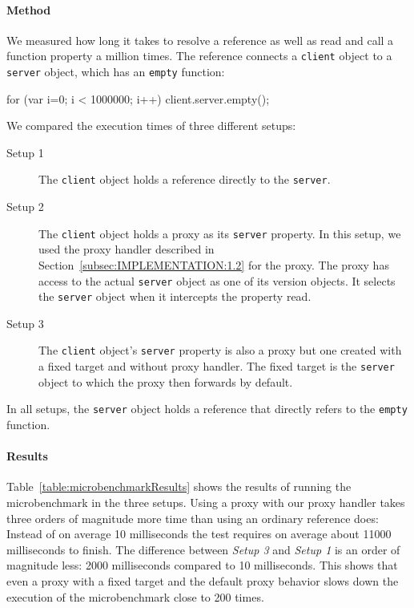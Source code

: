 \documentclass{sigplanconf}
\begin{document}
\paragraph{Method}
We measured how long it takes to resolve a reference as well as read
and call a function property a million times.  The reference connects
a \lstinline{client} object to a \lstinline{server} object, which has
an \lstinline{empty} function:

\begin{code}
for (var i=0; i < 1000000; i++) {
    client.server.empty();
} 
\end{code}

We compared the execution times of three different setups:

\begin{description}
\item[Setup 1] The \lstinline{client} object holds a reference
  directly to the \lstinline{server}.
    \item[Setup 2] The \lstinline{client} object holds a proxy as its
      \lstinline{server} property. In this setup, we used the proxy
      handler described in Section~\ref{subsec:IMPLEMENTATION:1.2} for
      the proxy. The proxy has access to the actual \lstinline{server}
      object as one of its version objects. It selects the
      \lstinline{server} object when it intercepts the property read.
    \item[Setup 3] The \lstinline{client} object's \lstinline{server}
      property is also a proxy but one created with a fixed target and
      without proxy handler. The fixed target is the
      \lstinline{server} object to which the proxy then forwards by
      default.
\end{description}

In all setups, the \lstinline{server} object holds a reference that
directly refers to the \lstinline{empty} function.

\paragraph{Results}
Table~\ref{table:microbenchmarkResults} shows the results of running
the microbenchmark in the three setups.  Using a proxy with our proxy
handler takes three orders of magnitude more time than using an
ordinary reference does: Instead of on average 10 milliseconds the
test requires on average about 11000 milliseconds to finish.  The
difference between \emph{Setup 3} and \emph{Setup 1} is an order of
magnitude less: 2000 milliseconds compared to 10 milliseconds.  This
shows that even a proxy with a fixed target and the default proxy
behavior slows down the execution of the microbenchmark close to 200
times.
\end{document}
